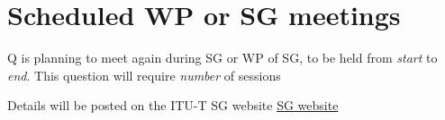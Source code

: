 
\section{Scheduled WP or SG\studyGroup{} meetings}\label{scheduled-wp-or-sg-meetings}

Q\questions{} is planning to meet again during SG\studyGroup{} or WP\workingParty{} of SG\studyGroup{}, to be held from \textit{start} to \textit{end}. This question will require \textit{number} of sessions

Details will be posted on the ITU-T SG\studyGroup{} website \href{https://www.itu.int/go/tsg17}{SG\studyGroup{} website}
